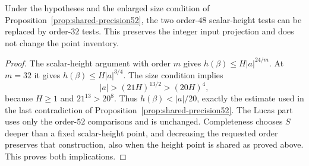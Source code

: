 \begin{corollary}
\label{cor:shared-scalar32}
Under the hypotheses and the enlarged size condition of
Proposition~\ref{prop:shared-precision52}, the two order-$48$ scalar-height
tests can be replaced by order-$32$ tests.  This preserves the integer input
projection and does not change the point inventory.
\end{corollary}
\begin{proof}
The scalar-height argument with order $m$ gives
$h(\beta)\le H|a|^{24/m}$.  At $m=32$ it gives
$h(\beta)\le H|a|^{3/4}$.  The size condition implies
\[
 |a|>(21H)^{13/2}>(20H)^4,
\]
because $H\ge1$ and $21^{13}>20^8$.  Thus
$h(\beta)<|a|/20$, exactly the estimate used in the last contradiction
of Proposition~\ref{prop:shared-precision52}.  The Lucas part uses only the
order-$52$ comparisons and is unchanged.  Completeness chooses $S$ deeper
than a fixed scalar-height point, and decreasing the requested order
preserves that construction, also when the height point is shared as
proved above.  This proves both implications.
\end{proof}
